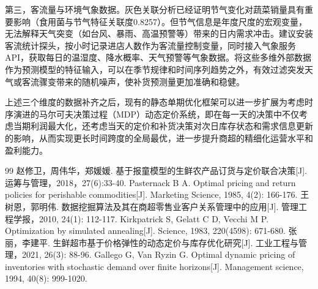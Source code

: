 \documentclass[withoutpreface]{cumcmthesis}
\begin{document}
第三，客流量与环境气象数据。灰色关联分析已经证明节气变化对蔬菜销量具有重要影响（食用菌与节气特征关联度0.8257）。但节气信息是年度尺度的宏观变量，无法解释天气突变（如台风、暴雨、高温预警等）带来的日内需求冲击。建议安装客流统计探头，按小时记录进店人数作为客流量控制变量，同时接入气象服务API，获取每日的温湿度、降水概率、天气预警等气象数据。将这些多维外部数据作为预测模型的特征输入，可以在季节规律和时间序列趋势之外，有效过滤突发天气或客流骤变带来的随机噪声，使补货预测量更加准确和稳健。

上述三个维度的数据补齐之后，现有的静态单期优化框架可以进一步扩展为考虑时序演进的马尔可夫决策过程（MDP）动态定价系统，即在每一天的决策中不仅考虑当期利润最大化，还考虑当天的定价和补货决策对次日库存状态和需求信息更新的影响，从而实现更长时间跨度的全局最优，进一步提升商超的精细化运营水平和盈利能力。

\begin{thebibliography}{99}
 赵修卫，周伟华，郑媛媛. 基于报童模型的生鲜农产品订货与定价联合决策[J]. 运筹与管理，2018，27(6):33-40.
 Pasternack B A. Optimal pricing and return policies for perishable commodities[J]. Marketing Science, 1985, 4(2): 166-176.
 王树恩，郭明伟. 数据挖掘算法及其在商超零售业客户关系管理中的应用[J]. 管理工程学报，2010, 24(1): 112-117.
 Kirkpatrick S, Gelatt C D, Vecchi M P. Optimization by simulated annealing[J]. Science, 1983, 220(4598): 671-680.
 张丽，李建平. 生鲜超市基于价格弹性的动态定价与库存优化研究[J]. 工业工程与管理，2021, 26(3): 88-96.
 Gallego G, Van Ryzin G. Optimal dynamic pricing of inventories with stochastic demand over finite horizons[J]. Management science, 1994, 40(8): 999-1020.
\end{thebibliography}
\end{document}
